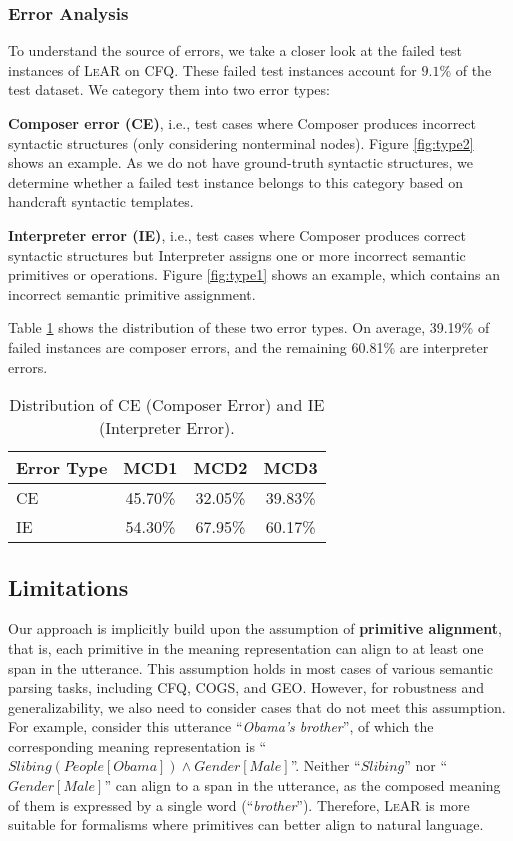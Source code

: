 \documentclass[11pt,a4paper]{article}
\begin{document}
\subsubsection{Error Analysis}

To understand the source of errors, we take a closer look at the failed test instances of \textsc{LeAR} on CFQ.
These failed test instances account for $9.1\%$ of the test dataset.
We category them into two error types:

\noindent\textbf{Composer error (CE)}, i.e., test cases where Composer produces incorrect syntactic structures (only considering nonterminal nodes).
Figure \ref{fig:type2} shows an example.
As we do not have ground-truth syntactic structures, we determine whether a failed test instance belongs to this category based on handcraft syntactic templates.

\noindent\textbf{Interpreter error (IE)}, i.e., test cases where Composer produces correct syntactic structures but Interpreter assigns one or more incorrect semantic primitives or operations.
Figure \ref{fig:type1} shows an example, which contains an incorrect semantic primitive assignment.


Table \ref{tab:err_type} shows the distribution of these two error types.
On average, 39.19\% of failed instances are composer errors, and the remaining 60.81\% are interpreter errors.

\begin{table}
\centering
\begin{tabular}{lccc}
\hline \textbf{Error Type} & \textbf{MCD1} & \textbf{MCD2} & \textbf{MCD3} \\ \hline
CE & 45.70\% & 32.05\% & 39.83\% \\
IE & 54.30\% & 67.95\% & 60.17\% \\
\hline
\end{tabular}
\caption{Distribution of CE (Composer Error) and IE (Interpreter Error). }
\label{tab:err_type}
\end{table}





\subsection{Limitations}

Our approach is implicitly build upon the assumption of \textbf{primitive alignment}, that is, each primitive in the meaning representation can align to at least one span in the utterance.
This assumption holds in most cases of various semantic parsing tasks, including CFQ, COGS, and GEO.
However, for robustness and generalizability, we also need to consider cases that do not meet this assumption.
For example, consider this utterance ``\textit{Obama's brother}'', of which the corresponding meaning representation is ``$Slibing(People[Obama])\wedge Gender[Male]$''.
Neither ``$Slibing$'' nor ``$Gender[Male]$'' can align to a span in the utterance, as the composed meaning of them is expressed by a single word (``\textit{brother}'').
Therefore, \textsc{LeAR} is more suitable for formalisms where primitives can better align to natural language.
\end{document}
